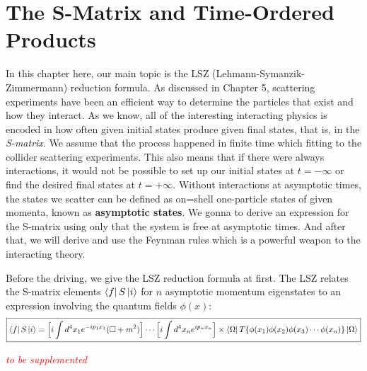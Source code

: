 \documentclass[12pt,openany]{book}
\begin{document}
	
	
	
	
	
	
	
	
	
	
	
	
	
	
	
	
	
	
	
	
	
	\chapter{The S-Matrix and Time-Ordered Products}
	In this chapter here, our main topic is the LSZ (Lehmann-Symanzik-Zimmermann) reduction formula. As discussed in Chapter 5, scattering experiments have been an efficient way to determine the particles that exist and how they interact.
	As we know, all of the interesting interacting physics is encoded in how often given initial states produce given final states, that is, in the \textit{S-matrix}. We assume that the process happened in 
	finite time which fitting to the collider scattering experiments. This also means that if there were always interactions, it would not be possible to set up our initial states at $t=-\infty$ or find the desired 
	final states at $t=+\infty$. Without interactions at asymptotic times, the states we scatter can be defined as on=shell one-particle states of given momenta, known as \textbf{asymptotic states}. We gonna to derive 
	an expression for the S-matrix using only that the system is free at asymptotic times. And after that, we will derive and use the Feynman rules which is a powerful weapon to the interacting theory.\par 
	Before the driving, we give the LSZ reduction formula at first. The LSZ relates the S-matrix elements $\bra{f}S\ket{i}$ for $n$ asymptotic momentum eigenstates to an expression involving the quantum fields $\phi(x)$:
	\begin{equation}
	\boxed{	\bra{f}S\ket{i}=\Big[i\int d^4x_1 e^{-ip_1x_1}(\Box+m^2)\Big]\cdots\Big[i\int d^4x_ne^{ip_nx_n}\Big]\times\bra{\Omega}T\{\phi(x_1)\phi(x_2)\phi(x_3)\cdots\phi(x_n)\}\ket{\Omega}}
	\end{equation}

	\begin{center}
		\textcolor{red}{\textit{to be supplemented}}
	\end{center}
	
	
	
	
	
\end{document}
